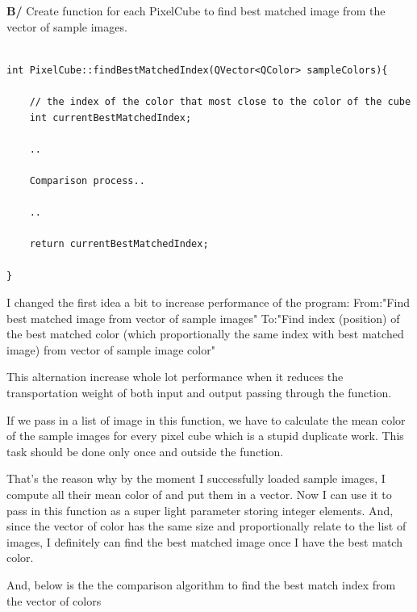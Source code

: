 \documentclass[english]{article}
\begin{document}
{\textbf{B/} Create function for each PixelCube to find best matched image from the vector of sample images. \newline

\lstset{language=C++}
\begin{lstlisting}

int PixelCube::findBestMatchedIndex(QVector<QColor> sampleColors){
	
	// the index of the color that most close to the color of the cube
	int currentBestMatchedIndex;
	
	..
	
	Comparison process..
	
	..
	
	return currentBestMatchedIndex;

}

\end{lstlisting}

I changed the first idea a bit to increase performance of the program: \newline 
From:\newline "Find best matched image from vector of sample images" \newline\newline
To:\newline "Find index (position) of the best matched color (which proportionally the same index with best matched image) from vector of sample image color"\newline

This alternation increase whole lot performance when it reduces the transportation weight of both input and output passing through the function.  \newline

If we pass in a list of image in this function, we have to calculate the mean color of the sample images for every pixel cube which is a stupid duplicate work. This task should be done only once and outside the function. \newline 

That's the reason why by the moment I successfully loaded sample images, I compute all their mean color of and put them in a vector. Now I can use it to pass in this function as a super light parameter storing integer elements. And, since the vector of color has the same size and proportionally relate to the list of images, I definitely can find the best matched image once I have the best match color. \newline

And, below is the the comparison algorithm to find the best match index from the vector of colors

}
\end{document}
